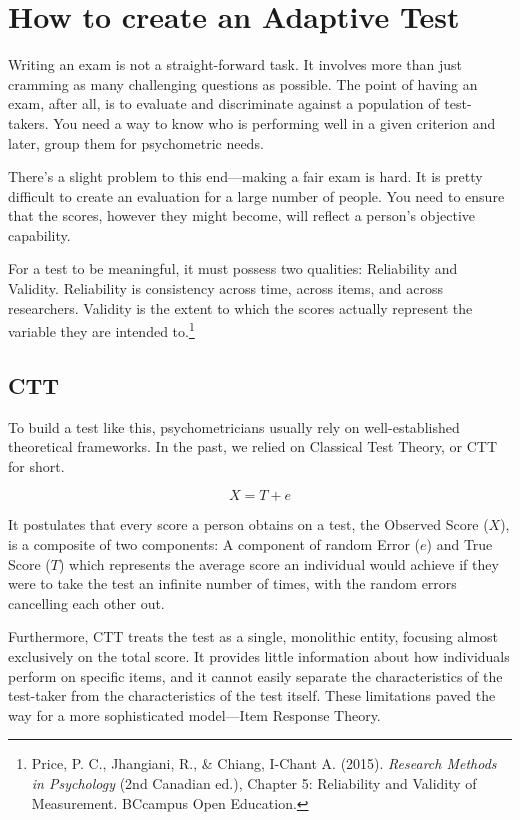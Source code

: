 \documentclass{article}
\begin{document}
\section*{How to create an Adaptive Test}

Writing an exam is not a straight-forward task. It involves more than just cramming as many challenging questions as possible. The point of having an exam, after all, is to evaluate and discriminate against a population of test-takers. You need a way to know who is performing well in a given criterion and later, group them for psychometric needs.

There's a slight problem to this end—making a fair exam is hard. It is pretty difficult to create an evaluation for a large number of people. You need to ensure that the scores, however they might become, will reflect a person's objective capability.

For a test to be meaningful, it must possess two qualities: Reliability and 
Validity. Reliability is consistency across time, across items, and across 
researchers. Validity is the extent to which the scores actually represent 
the variable they are intended to.\footnote{Price, P. C., Jhangiani, R., \& Chiang, I-Chant A. (2015). \textit{Research Methods in Psychology} (2nd Canadian ed.), Chapter 5: Reliability and Validity of Measurement. BCcampus Open Education.}

\subsection*{CTT}

To build a test like this, psychometricians usually rely on well-established theoretical frameworks. In the past, we relied on Classical Test Theory, or CTT for short.

\[
X = T + e
\]

It postulates that every score a person obtains on a test, the Observed Score ($X$), is a composite of two components: A component of random Error ($e$) and True Score ($T$) which represents the average score an individual would achieve if they were to take the test an infinite number of times, with the random errors cancelling each other out.

Furthermore, CTT treats the test as a single, monolithic entity, focusing almost exclusively on the total score. It provides little information about how individuals perform on specific items, and it cannot easily separate the characteristics of the test-taker from the characteristics of the test itself. These limitations paved the way for a more sophisticated model—Item Response Theory.
\end{document}
